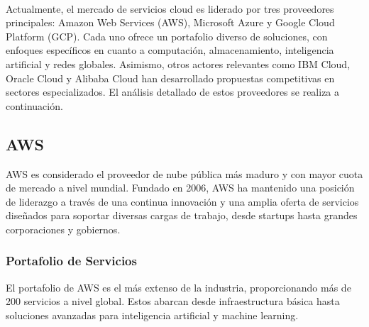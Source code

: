 {        \paragraph{}Actualmente, el mercado de servicios cloud es liderado por tres proveedores principales: Amazon Web Services (AWS), Microsoft Azure y Google Cloud Platform (GCP). Cada uno ofrece un portafolio diverso de soluciones, con enfoques específicos en cuanto a computación, almacenamiento, inteligencia artificial y redes globales. Asimismo, otros actores relevantes como IBM Cloud, Oracle Cloud y Alibaba Cloud han desarrollado propuestas competitivas en sectores especializados. El análisis detallado de estos proveedores se realiza a continuación.
            
        \subsection{AWS}
            AWS es considerado el proveedor de nube pública más maduro y con mayor cuota de mercado a nivel mundial. Fundado en 2006, AWS ha mantenido una posición de liderazgo a través de una continua innovación y una amplia oferta de servicios diseñados para soportar diversas cargas de trabajo, desde startups hasta grandes corporaciones y gobiernos.
            
            \subsubsection{Portafolio de Servicios}
                El portafolio de AWS es el más extenso de la industria, proporcionando más de 200 servicios a nivel global. Estos abarcan desde infraestructura básica hasta soluciones avanzadas para inteligencia artificial y machine learning.
                
}
